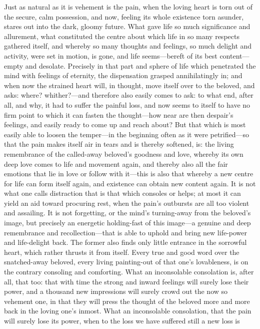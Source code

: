 \documentclass[12pt,a4paper]{book}
\begin{document}
Just as natural as it is vehement is the pain, when the loving heart is torn
out of the secure, calm possession, and now, feeling its whole existence
torn asunder, stares out into the dark, gloomy future. What gave life so
much significance and allurement, what constituted the centre about which
life in so many respects gathered itself, and whereby so many thoughts and
feelings, so much delight and activity, were set in motion, is gone, and
life seems---bereft of its best content---empty and desolate. Precisely in
that part and sphere of life which penetrated the mind with feelings of
eternity, the dispensation grasped annihilatingly in; and when now the
strained heart will, in thought, move itself over to the beloved, and asks:
where? whither?---and therefore also easily comes to ask: to what end, after
all, and why, it had to suffer the painful loss, and now seems to itself to
have no firm point to which it can fasten the thought---how near are then
despair's feelings, and easily ready to come up and reach about? But that
which is most easily able to loosen the temper---in the beginning often as
it were petrified---so that the pain makes itself air in tears and is
thereby softened, is: the living remembrance of the called-away beloved's
goodness and love, whereby its own deep love comes to life and movement
again, and thereby also all the fair emotions that lie in love or follow
with it---this is also that whereby a new centre for life can form itself
again, and existence can obtain new content again. It is not what one calls
distraction that is that which consoles or helps; at most it can yield an
aid toward procuring rest, when the pain's outbursts are all too violent
and assailing. It is not forgetting, or the mind's turning-away from the
beloved's image, but precisely an energetic holding-fast of this image---a
genuine and deep remembrance and recollection---that is able to uphold and
bring new life-power and life-delight back. The former also finds only
little entrance in the sorrowful heart, which rather thrusts it from itself.
Every true and good word over the snatched-away beloved, every living
painting-out of that one's lovableness, is on the contrary consoling and
comforting. What an inconsolable consolation is, after all, that too: that
with time the strong and inward feelings will surely lose their power, and a
thousand new impressions will surely crowd out the now so vehement one, in
that they will press the thought of the beloved more and more back in the
loving one's inmost. What an inconsolable consolation, that the pain will
surely lose its power, when to the loss we have suffered still a new loss is
\end{document}
